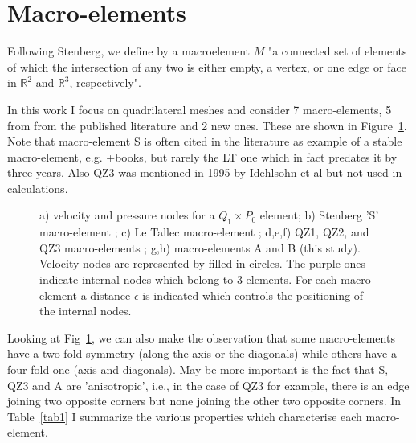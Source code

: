 \documentclass[a4paper]{article}
\begin{document}





\section{Macro-elements}\label{sec3}

Following Stenberg\cite{sten90}, we define by a macroelement $M$ "a connected set of elements of which the 
intersection of any two is either empty, a vertex, or one edge or face in $\mathbb{R}^2$ 
and $\mathbb{R}^3$, respectively".

In this work I focus on quadrilateral meshes and consider 7 
macro-elements, 5 from from the published literature and 2 new ones. These are shown in Figure~\ref{fig:mes}.
Note that macro-element S is often cited in the literature as example of a stable macro-element, 
e.g. \cite{chba93}+books, but rarely the LT one which in fact predates it by three years. 
Also QZ3 was mentioned in 1995 by Idehlsohn et al \cite{idsn95} but not used in calculations. 

\begin{figure}[t]

\caption{
a) velocity and pressure nodes for a $Q_1\times P_0$ element;
b) Stenberg 'S' macro-element \cite{sten84}; 
c) Le Tallec macro-element \cite{leta81,leru86}; 
d,e,f) QZ1, QZ2, and QZ3 macro-elements \cite{qizh07}; g,h) macro-elements A and B (this study).
Velocity nodes are represented by filled-in circles. The purple ones indicate internal nodes which belong to 3 elements.
For each macro-element a distance $\epsilon$ is indicated which controls the positioning of the internal nodes.
\label{fig:mes}}
\end{figure}

Looking  at Fig~\ref{fig:mes}, we can also make the observation that some macro-elements 
have a two-fold symmetry (along the axis or the diagonals) while others have a four-fold one 
(axis and diagonals). May be more important is the fact that S, QZ3 and A are 'anisotropic', i.e., in 
the case of QZ3 for example, there is an edge joining two opposite corners but none joining the 
other two opposite corners.
In Table~\ref{tab1} I summarize the various properties which characterise each macro-element.
\end{document}
